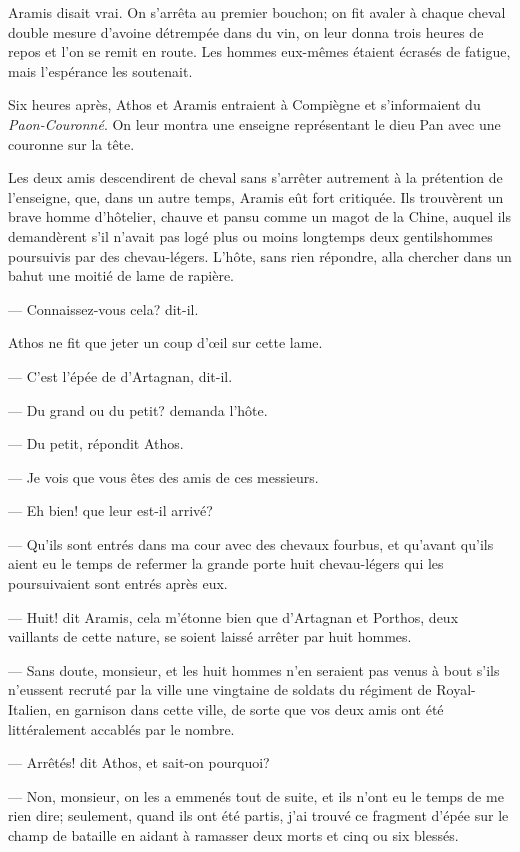Aramis disait vrai. On s'arrêta au premier bouchon; on fit avaler à chaque cheval double mesure d'avoine détrempée dans du vin, on leur donna trois heures de repos et l'on se remit en route. Les hommes eux-mêmes étaient écrasés de fatigue, mais l'espérance les soutenait.

Six heures après, Athos et Aramis entraient à Compiègne et s'informaient du \textit{Paon-Couronné}. On leur montra une enseigne représentant le dieu Pan avec une couronne sur la tête.

Les deux amis descendirent de cheval sans s'arrêter autrement à la prétention de l'enseigne, que, dans un autre temps, Aramis eût fort critiquée. Ils trouvèrent un brave homme d'hôtelier, chauve et pansu comme un magot de la Chine, auquel ils demandèrent s'il n'avait pas logé plus ou moins longtemps deux gentilshommes poursuivis par des chevau-légers. L'hôte, sans rien répondre, alla chercher dans un bahut une moitié de lame de rapière.

— Connaissez-vous cela? dit-il.

Athos ne fit que jeter un coup d'œil sur cette lame.

— C'est l'épée de d'Artagnan, dit-il.

— Du grand ou du petit? demanda l'hôte.

— Du petit, répondit Athos.

— Je vois que vous êtes des amis de ces messieurs.

— Eh bien! que leur est-il arrivé?

— Qu'ils sont entrés dans ma cour avec des chevaux fourbus, et qu'avant qu'ils aient eu le temps de refermer la grande porte huit chevau-légers qui les poursuivaient sont entrés après eux.

— Huit! dit Aramis, cela m'étonne bien que d'Artagnan et Porthos, deux vaillants de cette nature, se soient laissé arrêter par huit hommes.

— Sans doute, monsieur, et les huit hommes n'en seraient pas venus à bout s'ils n'eussent recruté par la ville une vingtaine de soldats du régiment de Royal-Italien, en garnison dans cette ville, de sorte que vos deux amis ont été littéralement accablés par le nombre.

— Arrêtés! dit Athos, et sait-on pourquoi?

— Non, monsieur, on les a emmenés tout de suite, et ils n'ont eu le temps de me rien dire; seulement, quand ils ont été partis, j'ai trouvé ce fragment d'épée sur le champ de bataille en aidant à ramasser deux morts et cinq ou six blessés.

